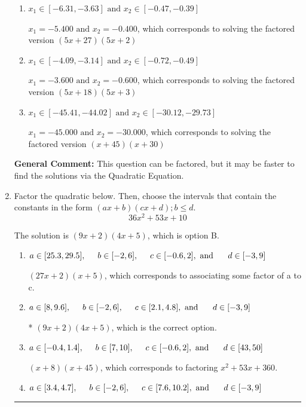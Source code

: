 \documentclass{extbook}[14pt]
\newcommand{\litem}[1]{\item #1

\rule{\textwidth}{0.4pt}}
\begin{document}
\begin{enumerate}
{\begin{enumerate}[label=\Alph*.]
$x_1 = -9.000 \text{ and } x_2 = -0.240$, which corresponds to solving the factored version $(x + 9)(25x + 6)$
\item \( x_1 \in [-6.31, -3.63] \text{ and } x_2 \in [-0.47, -0.39] \)

$x_1 = -5.400 \text{ and } x_2 = -0.400$, which corresponds to solving the factored version $(5x + 27)(5x + 2)$
\item \( x_1 \in [-4.09, -3.14] \text{ and } x_2 \in [-0.72, -0.49] \)

$x_1 = -3.600 \text{ and } x_2 = -0.600$, which corresponds to solving the factored version $(5x + 18)(5x + 3)$
\item \( x_1 \in [-45.41, -44.02] \text{ and } x_2 \in [-30.12, -29.73] \)

$x_1 = -45.000 \text{ and } x_2 = -30.000$, which corresponds to solving the factored version $(x + 45)(x + 30)$
\end{enumerate}

\textbf{General Comment:} This question can be factored, but it may be faster to find the solutions via the Quadratic Equation.
}
\litem{
Factor the quadratic below. Then, choose the intervals that contain the constants in the form $(ax+b)(cx+d); b \leq d.$
\[ 36x^{2} +53 x + 10 \]

The solution is \( (9x + 2)(4x + 5) \), which is option B.\begin{enumerate}[label=\Alph*.]
\item \( a \in [25.3, 29.5], \hspace*{5mm} b \in [-2, 6], \hspace*{5mm} c \in [-0.6, 2], \text{ and } \hspace*{5mm} d \in [-3, 9] \)

 $(27x + 2)(x + 5)$, which corresponds to associating some factor of a to c.
\item \( a \in [8, 9.6], \hspace*{5mm} b \in [-2, 6], \hspace*{5mm} c \in [2.1, 4.8], \text{ and } \hspace*{5mm} d \in [-3, 9] \)

* $(9x + 2)(4x + 5)$, which is the correct option.
\item \( a \in [-0.4, 1.4], \hspace*{5mm} b \in [7, 10], \hspace*{5mm} c \in [-0.6, 2], \text{ and } \hspace*{5mm} d \in [43, 50] \)

 $(x + 8)(x + 45)$, which corresponds to factoring $x^{2} +53 x + 360$.
\item \( a \in [3.4, 4.7], \hspace*{5mm} b \in [-2, 6], \hspace*{5mm} c \in [7.6, 10.2], \text{ and } \hspace*{5mm} d \in [-3, 9] \)


\end{enumerate}}
\end{enumerate}
\end{document}
